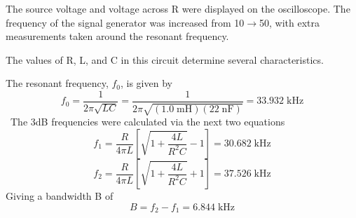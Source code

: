 \documentclass[12pt]{article}
\providecommand{\units}[1]{\;\text{#1}}
\begin{document}
The source voltage and voltage across R were displayed on the oscilloscope. The frequency of the signal generator was increased from 10$\to$50\units{kHz}, with extra measurements taken around the resonant frequency.

The values of R, L, and C in this circuit determine several characteristics.

The resonant frequency, $f_0$, is given by
\begin{equation*}
	f_{0}=\frac{1}{2\pi\sqrt{LC}}=\frac{1}{2\pi\sqrt{(1.0\units{mH})(22\units{nF})}}=33.932\units{kHz}
\end{equation*}\
The 3dB frequencies were calculated via the next two equations
\begin{equation*}
	f_{1}=\frac{R}{4\pi L}\left[\sqrt{1+\frac{4L}{R^{2}C}}-1\right] = 30.682\units{kHz} 
\end{equation*}
\begin{equation*}
	f_{2}=\frac{R}{4\pi L}\left[\sqrt{1+\frac{4L}{R^{2}C}}+1\right] = 37.526\units{kHz} 
\end{equation*}
Giving a bandwidth B of
\begin{equation*}
	B=f_{2}-f_{1}=6.844\units{kHz}
\end{equation*}
\end{document}
